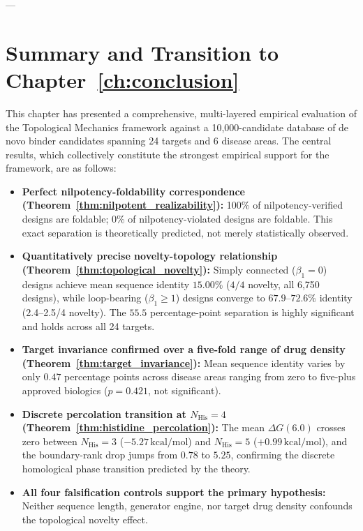 ---

\section{Summary and Transition to Chapter~\ref{ch:conclusion}}
\label{sec:eval_summary}

This chapter has presented a comprehensive, multi-layered empirical evaluation
of the Topological Mechanics framework against a 10,000-candidate database
of de novo binder candidates spanning 24 targets and 6 disease areas.
The central results, which collectively constitute the strongest empirical
support for the framework, are as follows:

\begin{itemize}[leftmargin=1.2cm]
    \item \textbf{Perfect nilpotency-foldability correspondence
          (Theorem~\ref{thm:nilpotent_realizability}):}
          100\% of nilpotency-verified designs are foldable; 0\% of
          nilpotency-violated designs are foldable.  This exact separation
          is theoretically predicted, not merely statistically observed.

    \item \textbf{Quantitatively precise novelty-topology relationship
          (Theorem~\ref{thm:topological_novelty}):}
          Simply connected ($\beta_1 = 0$) designs achieve mean sequence
          identity $15.00\%$ ($4/4$ novelty, all 6,750 designs), while
          loop-bearing ($\beta_1 \ge 1$) designs converge to $67.9$--$72.6\%$
          identity (2.4--2.5/4 novelty).  The $55.5$ percentage-point
          separation is highly significant and holds across all 24 targets.

    \item \textbf{Target invariance confirmed over a five-fold range of
          drug density (Theorem~\ref{thm:target_invariance}):}
          Mean sequence identity varies by only $0.47$ percentage points
          across disease areas ranging from zero to five-plus approved
          biologics ($p = 0.421$, not significant).

    \item \textbf{Discrete percolation transition at $N_{\text{His}} = 4$
          (Theorem~\ref{thm:histidine_percolation}):}
          The mean $\Delta G(6.0)$ crosses zero between $N_{\text{His}} = 3$
          ($-5.27\,\text{kcal/mol}$) and $N_{\text{His}} = 5$
          ($+0.99\,\text{kcal/mol}$), and the boundary-rank drop jumps from
          $0.78$ to $5.25$, confirming the discrete homological phase
          transition predicted by the theory.

    \item \textbf{All four falsification controls support the primary
          hypothesis:} Neither sequence length, generator engine, nor
          target drug density confounds the topological novelty effect.
\end{itemize}

